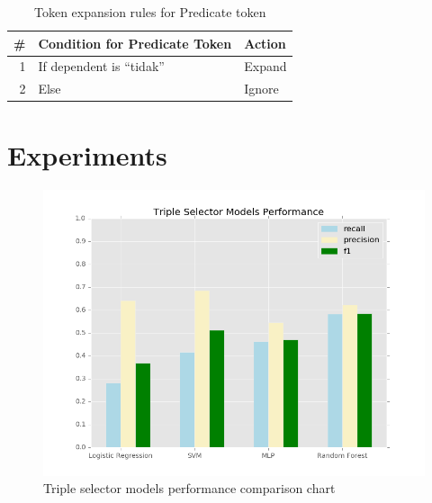 \documentclass[conference,compsoc]{IEEEtran}
\begin{document}
\begin{table}[!t]
\renewcommand{\arraystretch}{1.5}
\caption{Token expansion rules for Predicate token}
\label{table_token_expansion_rules_p}
\centering
\begin{tabular}{r|p{6cm}|l}
\hline
\textbf{\#} & \textbf{Condition for Predicate Token} & \textbf{Action} \\
\hline
1 & If dependent is “tidak” & Expand \\
2 & Else & Ignore \\
\end{tabular}
\end{table}

\section{Experiments}


\lipsum[1-2]

\begin{figure}
\includegraphics[scale=0.4]{models_performance}
\caption{Triple selector models performance comparison chart}
\label{fig_models_performance}
\end{figure}
\end{document}
